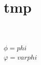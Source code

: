 
\title{tmp}
\usepackage{cancel}



\begin{align*}
	& \phi = phi \\
	& \varphi = varphi \\
\end{align*}



